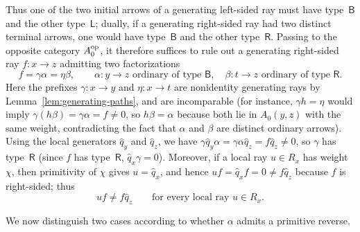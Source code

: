 Thus one of the two initial arrows of a generating left-sided ray must have type~$\mathsf B$ and the other type~$\mathsf L$; dually, if a generating right-sided ray had two distinct terminal arrows, one would have type~$\mathsf B$ and the other type~$\mathsf R$. Passing to the opposite category $A_0^{\mathrm{op}}$, it therefore suffices to rule out a generating right-sided ray $f\colon x\to z$ admitting two factorizations
\[
  f=\gamma\alpha=\eta\beta,\qquad
  \alpha\colon y\to z\text{ ordinary of type }\mathsf B,\quad
  \beta\colon t\to z\text{ ordinary of type }\mathsf R.
\]
Here the prefixes $\gamma\colon x\to y$ and $\eta\colon x\to t$ are nonidentity generating rays by Lemma~\ref{lem:generating-paths}, and are incomparable (for instance, $\gamma h=\eta$ would imply $\gamma(h\beta)=\gamma\alpha=f\ne0$, so $h\beta=\alpha$ because both lie in $A_0(y,z)$ with the same weight, contradicting the fact that $\alpha$ and $\beta$ are distinct ordinary arrows). Using the local generators $\widehat q_y$ and $\widehat q_z$, we have $\gamma\widehat q_y\alpha=\gamma\alpha\widehat q_z=f\widehat q_z\ne0$, so $\gamma$ has type~$\mathsf R$ (since $f$ has type~$\mathsf R$, $\widehat q_x\gamma=0$). Moreover, if a local ray $u\in R_x$ has weight $\chi$, then primitivity of $\chi$ gives $u=\widehat q_x$, and hence $uf=\widehat q_xf=0\ne f\widehat q_z$ because $f$ is right-sided; thus
\begin{equation}
  uf\ne f\widehat q_z\qquad\text{for every local ray }u\in R_x.
  \label{eq:absent-source-action}
\end{equation}

We now distinguish two cases according to whether $\alpha$ admits a primitive reverse.


